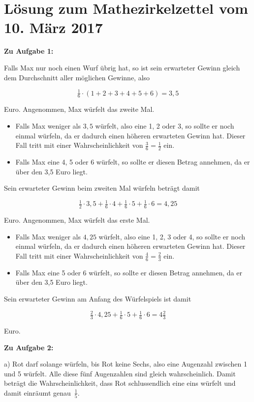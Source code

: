 \documentclass{article}
\begin{document}
\section{Lösung zum Mathezirkelzettel vom 10. März 2017}

\textbf{Zu Aufgabe 1:}

Falls Max nur noch einen Wurf übrig hat, so ist sein erwarteter Gewinn gleich dem Durchschnitt aller möglichen Gewinne, also

\[ \tfrac{1}{6} \cdot (1 + 2 + 3 + 4 + 5 + 6) = 3,5 \]

Euro. Angenommen, Max würfelt das zweite Mal.

\begin{itemize}
  \item Falls Max weniger als $3,5$ würfelt, also eine 1, 2 oder 3, so sollte er noch einmal würfeln, da er dadurch einen höheren erwarteten Gewinn hat. Dieser Fall tritt mit einer Wahrscheinlichkeit von $\tfrac{3}{6} = \tfrac{1}{2}$ ein.
  \item Falls Max eine 4, 5 oder 6 würfelt, so sollte er diesen Betrag annehmen, da er über den 3,5 Euro liegt.
\end{itemize}

Sein erwarteter Gewinn beim zweiten Mal würfeln beträgt damit

\[ \tfrac{1}{2} \cdot 3,5 + \tfrac{1}{6} \cdot 4 + \tfrac{1}{6} \cdot 5 + \tfrac{1}{6} \cdot 6 = 4,25 \]

Euro. Angenommen, Max würfelt das erste Mal.

\begin{itemize}
  \item Falls Max weniger als $4,25$ würfelt, also eine 1, 2, 3 oder 4, so sollte er noch einmal würfeln, da er dadurch einen höheren erwarteten Gewinn hat. Dieser Fall tritt mit einer Wahrscheinlichkeit von $\tfrac{4}{6} = \tfrac{2}{3}$ ein.
  \item Falls Max eine 5 oder 6 würfelt, so sollte er diesen Betrag annehmen, da er über den 3,5 Euro liegt.
\end{itemize}

Sein erwarteter Gewinn am Anfang des Würfelspiels ist damit

\[ \tfrac{2}{3} \cdot 4,25 + \tfrac{1}{6} \cdot 5 + \tfrac{1}{6} \cdot 6 = 4 \tfrac{2}{3} \]

Euro.

\textbf{Zu Aufgabe 2:}

a) Rot darf solange würfeln, bis Rot keine Sechs, also eine Augenzahl zwischen 1 und 5 würfelt. Alle diese fünf Augenzahlen sind gleich wahrscheinlich. Damit beträgt die Wahrscheinlichkeit, dass Rot schlussendlich eine eins würfelt und damit einräumt genau~$\tfrac{1}{5}$.
\end{document}
